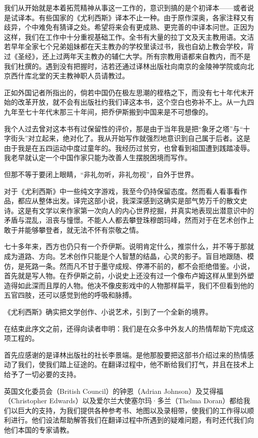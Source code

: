 \par 我们从开始就是本着拓荒精神从事这一工作的，意识到搞的是个初译本——或者说是试译本。有些国家的《尤利西斯》译本不止一种。由于原作深奥，各家注释又有歧异，个中难免有猜译之处。希望将来会有更成熟、更完善的中译本问世。正因为这样，我们在工作中十分重视基础工作。全书有大量的拉丁文及天主教用语。文洁若早年全家七个兄弟姐妹都在天主教办的学校里读过书，我也自幼上教会学校，背过《圣经》，还上过两年天主教办的辅仁大学。所有宗教用语都来自教内，而不是我们杜撰的。遇到没有把握时，洁若还通过译林出版社向南京的金陵神学院或向北京西什库北堂的天主教神职人员请教过。
\par 正如外国记者所指出的，倘若中国仍在极左思潮的桎梏之下，而没有七十年代末开始的改革开放，就不会有出版社约我们译这本书，这个空白也弥补不上。从一九四九年至七十年代末那三十年间，把乔伊斯搬到中国来是不可想像的。
\par 我个人过去曾对这本书有过保留性的评价，那是由于当年我是把“象牙之塔”与“十字街头”对立起来，绝对化了。我从开始写作就强烈地意识到自己属于后者。这是由于我是在五四运动中度过童年的。我经历过贫穷，也曾看到祖国遭到践踏凌辱。我老早就认定一个中国作家只能为改善人生摆脱困境而写作。
\par 但那不等于要闭上眼睛，“非礼勿听，非礼勿视”，自外于世界。
\par 对于《尤利西斯》中一些纯文字游戏，我至今仍持保留态度。然而看人看事看作品，都应从整体出发。译完这部小说，我深深感到这确实是部气势万千的散文史诗。这是有文学以来作家第一次向人的内心世界挖掘，并真实地表现出潜意识中的矛盾与混乱，沮丧与憧憬。不能人人都去攀登珠穆朗玛峰，然而对于在艺术创作上敢于并能够攀登者，就无法不怀有崇敬之情。
\par 七十多年来，西方也仍只有一个乔伊斯。说明肯定什么，推崇什么，并不等于那就成为道路、方向。艺术创作只能是个人智慧的结晶，心灵的影子。盲目地跟随、模仿，是死路一条。然而凡不甘于墨守成规、停滞不前的，都不会拒绝借鉴。小说，首先就是写人物。在乔伊斯之前，小说史上还没有过一个像布卢姆这样从里到外塑造得如此深而且厚的人物。他决不像皮影戏中的人物那样扁平，我们不但看到他的五官四肢，还可以感觉到他的呼吸和脉搏。
\par 《尤利西斯》确实把文学创作、小说艺术，引到了一个全新的境界。
\par 在结束此序文之前，还得向读者申明：我们是在众多中外友人的热情帮助下完成这项工程的。
\par 首先应感谢的是译林出版社的社长李景端。是他那股要把这部书介绍过来的热情感动了我们，使我们踏上征途的。在翻译过程中，他不断给我们打气，并且在技术上给予了一切必要的支持。
\par 英国文化委员会（British Council）的钟恩（Adrian Johnson）及艾得福（Christopher Edwards）以及爱尔兰大使塞尔玛·多兰（Thelma Doran）都给我们以巨大的支持，为我们提供各种参考书、地图以及录相带，使我们的工作得以顺利进行。他们设法帮助解答我们在翻译过程中所遇到的疑难问题，有时还代我们向他们本国的专家请教。
